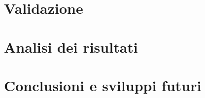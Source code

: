 \documentclass[11pt]{article}
\begin{document}

\section{Validazione}

\section{Analisi dei risultati}

\section{Conclusioni e sviluppi futuri}






\newpage
\printbibliography	
\end{document}
